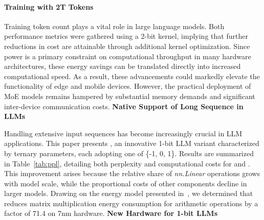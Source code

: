 \paragraph{Training with 2T Tokens}

Training token count plays a vital role in large language models. Both performance metrics were gathered using a 2-bit kernel, implying that further reductions in cost are attainable through additional kernel optimization. Since power is a primary constraint on computational throughput in many hardware architectures, these energy savings can be translated directly into increased computational speed. As a result, these advancements could markedly elevate the functionality of edge and mobile devices. However, the practical deployment of MoE models remains hampered by substantial memory demands and significant inter-device communication costs. \textbf{Native Support of Long Sequence in LLMs}

Handling extensive input sequences has become increasingly crucial in LLM applications. This paper presents \textbf{}, an innovative 1-bit LLM variant characterized by ternary parameters, each adopting one of \{-1, 0, 1\}. Results are summarized in Table~\ref{tab:ppl}, detailing both perplexity and computational costs for  and . This improvement arises because the relative share of \emph{nn.Linear} operations grows with model scale, while the proportional costs of other components decline in larger models. Drawing on the energy model presented in~\cite{energycost, pokebnn}, we determined that  reduces matrix multiplication energy consumption for arithmetic operations by a factor of 71.4 on 7nm hardware. \textbf{New Hardware for 1-bit LLMs}

